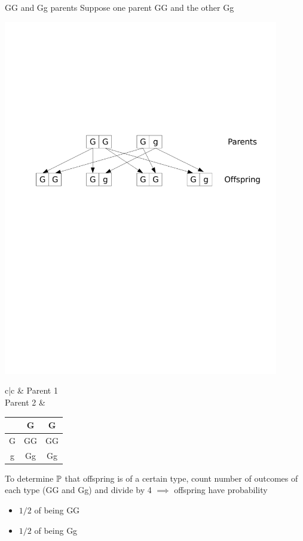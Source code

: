 \documentclass[aspectratio=169]{beamer}\usepackage[]{graphicx}\usepackage[]{xcolor}
\begin{document}
\begin{frame}{GG and Gg parents}
Suppose one parent GG and the other Gg
\vfill
\begin{center}
	\includegraphics[width=0.9\textwidth]{FIGS_slides/dominant_hybrid}
\end{center}
\begin{center}
\begin{tabular}{c|c}
& Parent 1 \\ 
\hline
Parent 2 &
\begin{tabular}{c|cc}
& G & G \\
\hline
G & GG & GG \\
g & Gg & Gg
\end{tabular}
\end{tabular}
\end{center}
To determine $\mathbb{P}$ that offspring is of a certain type, count number of outcomes of each type (GG and Gg) and divide by 4
\vfill
$\implies$ offspring have probability
\begin{itemize}
\item $1/2$ of being GG
\item $1/2$ of being Gg
\end{itemize}
\end{frame}
\end{document}
